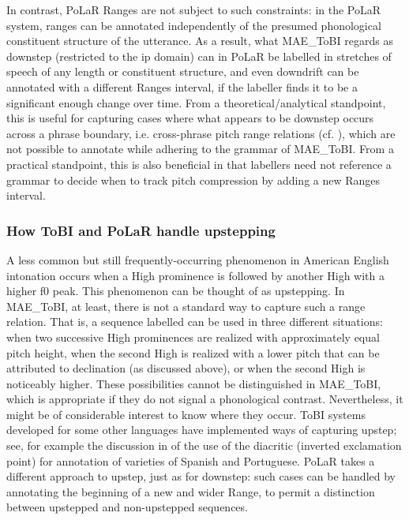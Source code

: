 \documentclass[11pt, twoside]{memoir}
\def\textlabel#1{{\relsize{-.5}\fontspec[Mapping=tex-text]{Roboto Mono}{#1}}}
\begin{document}
In contrast, PoLaR Ranges are not subject to such constraints: in the PoLaR system, ranges can be annotated independently of the presumed phonological constituent structure of the utterance. As a result, what MAE\_ToBI regards as downstep (restricted to the ip domain) can in PoLaR be labelled in stretches of speech of any length or constituent structure, and even downdrift can be annotated with a different Ranges interval, if the labeller finds it to be a significant enough change over time. From a theoretical\slash analytical standpoint, this is useful for capturing cases where what appears to be downstep occurs across a phrase boundary, i.e. cross-phrase pitch range relations (cf. \citealt{ladd88, brugos15}), which are not possible to annotate while adhering to the grammar of MAE\_ToBI. From a practical standpoint, this is also beneficial in that labellers need not reference a grammar to decide when to track pitch compression by adding a new Ranges interval.

\subsubsection{How ToBI and PoLaR handle upstepping}\label{sec:upstepping}
A less common but still frequently-occurring phenomenon in American English intonation occurs when a High prominence is followed by another High with a higher f0 peak.  This phenomenon can be thought of as upstepping. In MAE\_ToBI, at least, there is not a standard way to capture such a range relation.  That is, a sequence labelled \textlabel{H* H*} can be used in three different situations: when two successive High prominences are realized with approximately equal pitch height, when the second High is realized with a lower pitch that can be attributed to declination (as discussed above), or when the second High is noticeably higher. These possibilities cannot be distinguished in MAE\_ToBI, which is appropriate if they do not signal a phonological contrast. Nevertheless, it might be of considerable interest to know where they occur. ToBI systems developed for some other languages have implemented ways of capturing upstep; see, for example the discussion in \citet{armstrong-14} of the use of the \textlabel{¡} diacritic (inverted exclamation point) for annotation of varieties of Spanish and Portuguese. PoLaR takes a different approach to upstep, just as for downstep: such cases can be handled by annotating the beginning of a new and wider Range, to permit a distinction between upstepped and non-upstepped sequences.
\end{document}

